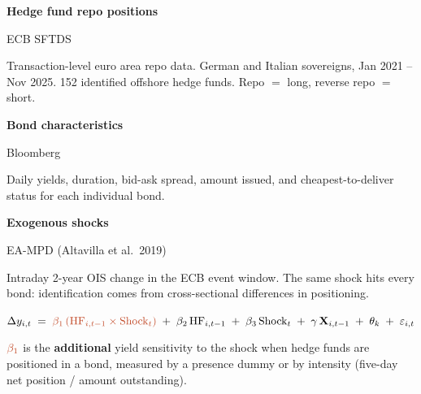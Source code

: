 \documentclass{article}
\newcommand{\fHead}{\fontsize{33}{42}\selectfont}
\newcommand{\fBody}{\fontsize{25}{33}\selectfont}
\newcommand{\fSmall}{\fontsize{21}{28}\selectfont}
\begin{document}
\begin{minipage}[t]{200mm}
  {\fHead\bfseries\color{navy}Hedge fund repo positions\par}\vspace{1.5mm}
  {\fSmall\color{midgrey}ECB SFTDS\par}\vspace{2mm}
  {\fBody Transaction-level euro area repo data. German and Italian sovereigns, Jan 2021 -- Nov 2025. 152 identified offshore hedge funds. Repo $=$ long, reverse repo $=$ short.\par}
\end{minipage}\hfill
\begin{minipage}[t]{195mm}
  {\fHead\bfseries\color{navy}Bond characteristics\par}\vspace{1.5mm}
  {\fSmall\color{midgrey}Bloomberg\par}\vspace{2mm}
  {\fBody Daily yields, duration, bid-ask spread, amount issued, and cheapest-to-deliver status for each individual bond.\par}
\end{minipage}\hfill
\begin{minipage}[t]{200mm}
  {\fHead\bfseries\color{navy}Exogenous shocks\par}\vspace{1.5mm}
  {\fSmall\color{midgrey}EA-MPD (Altavilla et al.\ 2019)\par}\vspace{2mm}
  {\fBody Intraday 2-year OIS change in the ECB event window. The same shock hits every bond: identification comes from cross-sectional differences in positioning.\par}
\end{minipage}

\vspace{8mm}
\begin{tcolorbox}[colback=pale,colframe=pale,arc=3mm,left=9mm,right=9mm,top=6mm,bottom=6mm]
  \centering\fBody
  $\Delta y_{i,t} \;=\; {\color{rust}\beta_1\,(\mathrm{HF}_{i,t-1} \times \mathrm{Shock}_{t})} \;+\; \beta_2\, \mathrm{HF}_{i,t-1} \;+\; \beta_3\, \mathrm{Shock}_{t} \;+\; \gamma\, \mathbf{X}_{i,t-1} \;+\; \theta_{k} \;+\; \varepsilon_{i,t}$
  \par\vspace{3mm}
  {\fSmall ${\color{rust}\beta_1}$ is the \textbf{additional} yield sensitivity to the shock when hedge funds are positioned in a bond, measured by a presence dummy or by intensity (five-day net position / amount outstanding).\par}
\end{tcolorbox}
\end{document}
